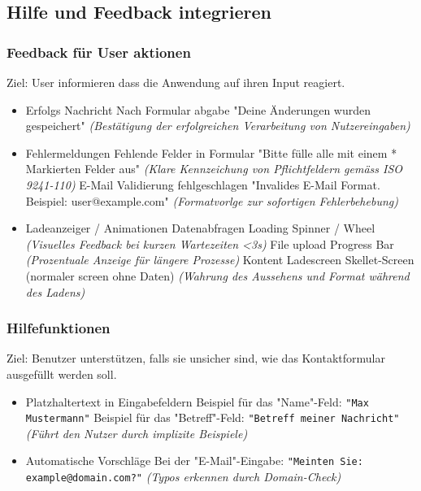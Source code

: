 \documentclass[10pt]{article}
\begin{document}
	\pagebreak
	
	\subsection{Hilfe und Feedback integrieren}
	
	\subsubsection{Feedback für User aktionen}
	
	Ziel: User informieren dass die Anwendung auf ihren Input reagiert.
	
	\begin{itemize}
		\item Erfolgs Nachricht
			\subitem Nach Formular abgabe
				\subsubitem "Deine Änderungen wurden gespeichert"
				\subsubitem \textit{(Bestätigung der erfolgreichen Verarbeitung von Nutzereingaben)}
		\item Fehlermeldungen
			\subitem Fehlende Felder in Formular
				\subsubitem "Bitte fülle alle mit einem * Markierten Felder aus"
				\subsubitem \textit{(Klare Kennzeichung von Pflichtfeldern gemäss ISO 9241-110)}
			\subitem E-Mail Validierung fehlgeschlagen
				\subsubitem "Invalides E-Mail Format. Beispiel: user@example.com"
				\subsubitem \textit{(Formatvorlge zur sofortigen Fehlerbehebung)}
		\item Ladeanzeiger / Animationen
			\subitem Datenabfragen
				\subsubitem Loading Spinner / Wheel
				\subsubitem \textit{(Visuelles Feedback bei kurzen Wartezeiten <3s)}
			\subitem File upload
				\subsubitem Progress Bar
				\subsubitem \textit{(Prozentuale Anzeige für längere Prozesse)}
			\subitem Kontent Ladescreen
				\subsubitem Skellet-Screen (normaler screen ohne Daten)
				\subsubitem \textit{(Wahrung des Aussehens und Format während des Ladens)}
	\end{itemize}
	\subsubsection{Hilfefunktionen}
	
	Ziel: Benutzer unterstützen, falls sie unsicher sind, wie das Kontaktformular ausgefüllt werden soll.
	
	\begin{itemize}
		\item Platzhaltertext in Eingabefeldern
			\subitem Beispiel für das "Name"-Feld:
				\subsubitem \texttt{"Max Mustermann"}
			\subitem Beispiel für das "Betreff"-Feld:
				\subsubitem \texttt{"Betreff meiner Nachricht"}
				\subsubitem \textit{(Führt den Nutzer durch implizite Beispiele)}
		
		\item Automatische Vorschläge
			\subitem Bei der "E-Mail"-Eingabe:
				\subsubitem \texttt{"Meinten Sie: example@domain.com?"}
				\subsubitem \textit{(Typos erkennen durch Domain-Check)}
	\end{itemize}
	
\end{document}

